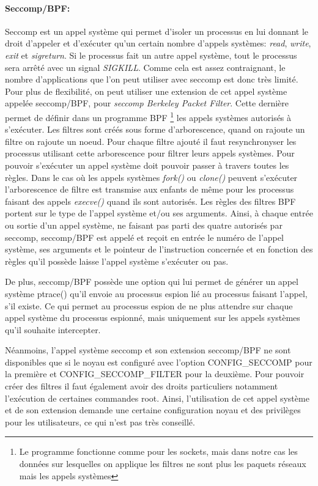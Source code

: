\paragraph{Seccomp/BPF:}
Seccomp \cite{INTERCEPTION:seccomp_bpf} est un appel système qui permet d'isoler
un processus en lui donnant le droit d'appeler et d'exécuter qu'un certain
nombre d'appels systèmes: \textit{read}, \textit{write}, \textit{exit} et
\textit{sigreturn}. Si le processus fait un autre appel système, tout le
processus sera arrêté avec un signal \textit{SIGKILL}. Comme cela est assez
contraignant, le nombre d'applications que l'on peut utiliser avec seccomp est
donc très limité. Pour plus de flexibilité, on peut utiliser une extension de
cet appel système appelée seccomp/BPF, pour \textit{seccomp Berkeley Packet
  Filter}. Cette dernière permet de définir dans un programme BPF \footnote{Le
  programme fonctionne comme pour les sockets, mais dans notre cas les données
  sur lesquelles on applique les filtres ne sont plus les paquets réseaux mais
  les appels systèmes} \cite{INTERCEPTION:bpf} les appels systèmes autorisés à
s'exécuter. Les filtres sont créés sous forme d'arborescence, quand on rajoute
un filtre on rajoute un noeud. Pour chaque filtre ajouté il faut resynchronyser
les processus utilisant cette arborescence pour filtrer leurs appels
systèmes. Pour pouvoir s'exécuter un appel système doit pouvoir passer à travers
toutes les règles. Dans le cas où les appels systèmes \textit{fork()} ou
\textit{clone()} peuvent s'exécuter l'arborescence de filtre est transmise aux
enfants de même pour les processus faisant des appels \textit{execve()} quand
ils sont autorisés. Les règles des filtres BPF portent sur le type de l'appel
système et/ou ses arguments. Ainsi, à chaque entrée ou sortie d'un appel
système, ne faisant pas parti des quatre autorisés par seccomp, seccomp/BPF est
appelé et reçoit en entrée le numéro de l'appel système, ses arguments et le
pointeur de l'instruction concernée et en fonction des règles qu'il possède
laisse l'appel système s'exécuter ou pas.

De plus, seccomp/BPF possède une option qui lui permet de générer un appel
système ptrace() qu'il envoie au processus espion lié au processus faisant
l'appel, s'il existe. Ce qui permet au processus espion de ne plus attendre sur
chaque appel système du processus espionné, mais uniquement sur les appels
systèmes qu'il souhaite intercepter.

Néanmoins, l'appel système seccomp et son extension seccomp/BPF ne sont
disponibles que si le noyau est configuré avec l'option CONFIG\_SECCOMP pour la
première et CONFIG\_SECCOMP\_FILTER pour la deuxième. Pour pouvoir créer des
filtres il faut également avoir des droits particuliers notamment l'exécution de
certaines commandes root. Ainsi, l'utilisation de cet appel système et de son
extension demande une certaine configuration noyau et des privilèges pour les
utilisateurs, ce qui n'est pas très conseillé.

